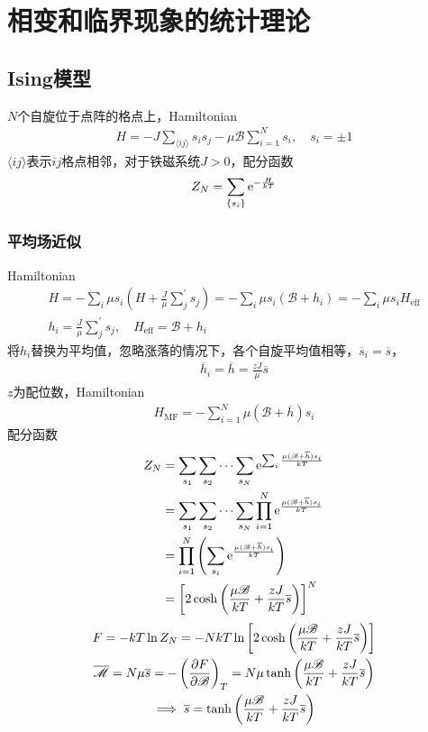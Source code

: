 \chapter{相变和临界现象的统计理论}

\section{Ising模型}

$N$个自旋位于点阵的格点上，Hamiltonian
\begin{gather*}
    H = -J \sum_{\langle ij \rangle} s_i s_j - \mu \mathscr{B} \sum_{i=1}^{N} s_i, \quad s_i = \pm 1
\end{gather*}
$\langle ij \rangle$表示$ij$格点相邻，对于铁磁系统$J > 0$，配分函数
\begin{gather*}
    Z_N = \sum_{\{s_i\}} \mathrm{e}^{-\frac{H}{kT}}
\end{gather*}

\subsection{平均场近似}

Hamiltonian
\begin{gather*}
    H = - \sum_{i} \mu s_i \left(H+\frac{J}{\mu} \sum_{j}^{'} s_j\right) = -\sum_i \mu s_i (\mathscr{B}+h_i) = - \sum_{i} \mu s_i H_{\mathrm{eff}}
    \\
    h_i = \frac{J}{\mu} \sum_{j}^{'} s_j, \quad H_{\mathrm{eff}} = \mathscr{B} + h_i
\end{gather*}
将$h_i$替换为平均值，忽略涨落的情况下，各个自旋平均值相等，$\overline{s}_i = \overline{s}$，
\begin{gather*}
    \overline{h}_i = \overline{h} = \frac{zJ}{\mu} \overline{s}
\end{gather*}
$z$为配位数，Hamiltonian
\begin{gather*}
    H_{\textrm{MF}} = - \sum_{i=1}^{N} \mu (\mathscr{B} + \overline{h}) s_i
\end{gather*}
配分函数
\begin{align*}
    Z_N &= \sum_{s_1} \sum_{s_2} \cdots \sum_{s_N} \mathrm{e}^{\sum_i \frac{\mu (\mathscr{B} + \overline{h}) s_i}{kT}}
    \\
    &= \sum_{s_1} \sum_{s_2} \cdots \sum_{s_N} \prod_{i=1}^{N} \mathrm{e}^{\frac{\mu (\mathscr{B} + \overline{h}) s_i}{kT}}
    \\
    &= \prod_{i=1}^{N} \left(\sum_{s_i} \mathrm{e}^{\frac{\mu (\mathscr{B} + \overline{h}) s_i}{kT}}\right)
    \\
    &= \left[2\cosh \left(\frac{\mu \mathscr{B}}{kT}+\frac{zJ}{kT} \overline{s}\right)\right]^N
\end{align*}
\begin{gather*}
    F = -kT \ln Z_N = -NkT \ln \left[2\cosh \left(\frac{\mu \mathscr{B}}{kT}+\frac{zJ}{kT} \overline{s}\right)\right]
    \\
    \overline{\mathscr{M}} = N \mu \overline{s} = -\left(\frac{\partial F}{\partial \mathscr{B}}\right)_T = N \mu \tanh \left(\frac{\mu \mathscr{B}}{kT}+\frac{zJ}{kT} \overline{s}\right)
    \\
    \implies \overline{s} = \tanh \left(\frac{\mu \mathscr{B}}{kT}+\frac{zJ}{kT} \overline{s}\right)
\end{gather*}

